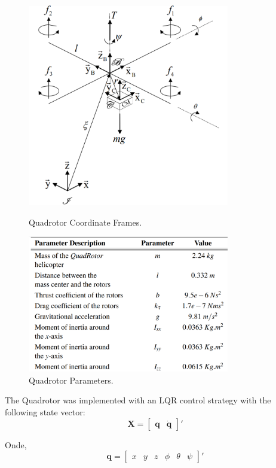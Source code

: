 \begin{figure} [!ht]
	\centering
	\begin{minipage}{.5\textwidth}
		\centering
		\includegraphics[width=250pt]{figuras/quadframes}
		\caption{Quadrotor Coordinate Frames.}
		\label{quadframes}
	\end{minipage}%
	\begin{minipage}{.5\textwidth}
		\centering
		\includegraphics[width=250pt]{figuras/quad_parameters_table}
		\caption{Quadrotor Parameters.}
		\label{quadtab}
	\end{minipage}
\end{figure}

The Quadrotor was implemented with an LQR control strategy with the following state vector:
\begin{equation*}
\bm{X} = \begin{bmatrix}
\bm{q} & \dot{\bm{q}}
\end{bmatrix}'
\end{equation*}

Onde, 
\begin{equation*}
\bm{q} = \begin{bmatrix}
x & y & z & \phi & \theta & \psi
\end{bmatrix}'
\end{equation*}


